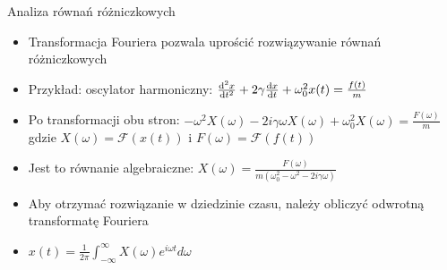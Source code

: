\documentclass[polish, 12pt, aspectratio=169]{beamer}
\begin{document}
\begin{frame}{Analiza równań różniczkowych}
    \pause{}
    \begin{itemize}[<+->]
        \item Transformacja Fouriera pozwala uprościć rozwiązywanie równań różniczkowych
        \item Przykład: oscylator harmoniczny: \( \dv[2]{x}{t} + 2\gamma \dv{x}{t} + \omega_0^2 x(t) = \frac{f(t)}{m} \)
        \item Po transformacji obu stron: \( -\omega^2 X(\omega) - 2i\gamma\omega X(\omega) + \omega_0^2 X(\omega) = \frac{F(\omega)}{m} \) \\
              gdzie \( X(\omega) = \mathcal{F}(x(t)) \) i \( F(\omega) = \mathcal{F}(f(t)) \)
        \item Jest to równanie algebraiczne: \( X(\omega) = \frac{F(\omega)}{m(\omega_0^2 - \omega^2 - 2i\gamma\omega)} \)
        \item Aby otrzymać rozwiązanie w dziedzinie czasu, należy obliczyć odwrotną transformatę Fouriera
        \item \( x(t) = \frac{1}{2\pi} \int_{-\infty}^{\infty} X(\omega) e^{i\omega t} d\omega \)
    \end{itemize}
\end{frame}
\end{document}
